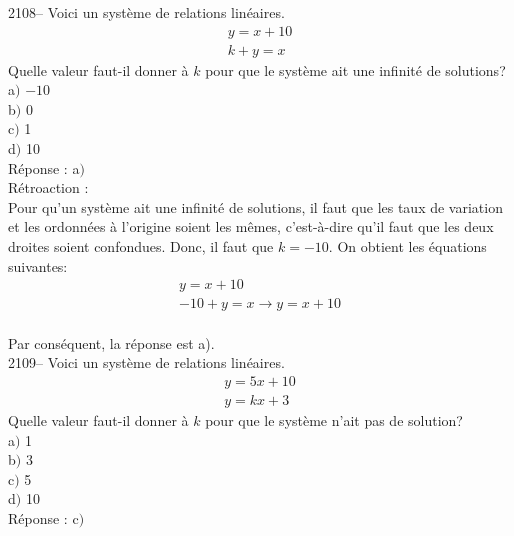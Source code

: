 \documentclass[letterpaper, 12pt]{article}
\begin{document}
2108-- Voici un syst\`eme de relations lin\'eaires.
\begin{eqnarray*}
 y=x+10\\
k+y=x
\end{eqnarray*}
Quelle valeur faut-il donner \`a $k$ pour que le syst\`eme ait une infinit\'e de solutions? \\

a$)$ $-10$\\
b$)$ 0\\
c$)$ 1\\
d$)$ 10\\

R\'eponse : a$)$\\

R\'etroaction :\\
Pour qu'un syst\`eme ait une infinit\'e de solutions, il faut que les taux de variation et les ordonn\'ees \`a l'origine soient les m\^emes, c'est-\`a-dire qu'il faut que les deux droites soient confondues. Donc, il faut que $k = -10$. On obtient les \'equations suivantes:
\begin{eqnarray*}
 y=x+10\\
-10+y=x \longrightarrow y=x+10
\end{eqnarray*}\\
Par cons\'equent, la r\'eponse est a).\\

2109-- Voici un syst\`eme de relations lin\'eaires.
\begin{eqnarray*}
 y=5x+10\\
y=kx+3
\end{eqnarray*}
Quelle valeur faut-il donner \`a $k$ pour que le syst\`eme n'ait pas de solution? \\

a$)$ 1\\
b$)$ 3\\
c$)$ 5\\
d$)$ 10\\

R\'eponse : c$)$\\
\end{document}
